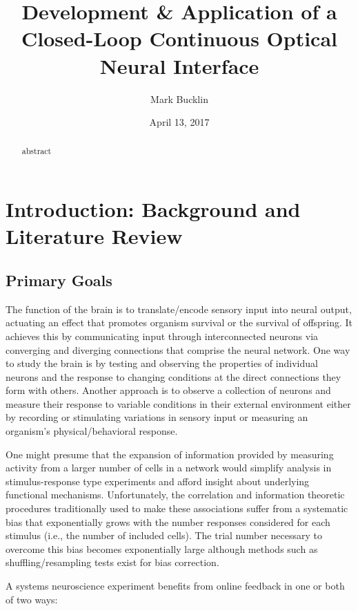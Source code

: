 \documentclass[
  12pt,
]{report}
\title{Development \& Application of a Closed-Loop Continuous Optical Neural
Interface}
\author{Mark Bucklin}
\date{April 13, 2017}
\numberwithin{figure}{section}
\numberwithin{table}{section}
\numberwithin{equations}{section}
\begin{document}
\maketitle
\begin{abstract}
abstract
\end{abstract}

{
\hypersetup{linkcolor=}
\setcounter{tocdepth}{2}
\tableofcontents
}
\listoftables
\listoffigures
\hypertarget{introduction-background-and-literature-review}{%
\chapter{Introduction: Background and Literature
Review}\label{introduction-background-and-literature-review}}

\hypertarget{primary-goals}{%
\section{Primary Goals}\label{primary-goals}}

The function of the brain is to translate/encode sensory input into
neural output, actuating an effect that promotes organism survival or
the survival of offspring. It achieves this by communicating input
through interconnected neurons via converging and diverging connections
that comprise the neural network. One way to study the brain is by
testing and observing the properties of individual neurons and the
response to changing conditions at the direct connections they form with
others. Another approach is to observe a collection of neurons and
measure their response to variable conditions in their external
environment either by recording or stimulating variations in sensory
input or measuring an organism's physical/behavioral response.

One might presume that the expansion of information provided by
measuring activity from a larger number of cells in a network would
simplify analysis in stimulus-response type experiments and afford
insight about underlying functional mechanisms. Unfortunately, the
correlation and information theoretic procedures traditionally used to
make these associations suffer from a systematic bias that exponentially
grows with the number responses considered for each stimulus (i.e., the
number of included cells). The trial number necessary to overcome this
bias becomes exponentially large although methods such as
shuffling/resampling tests exist for bias correction.

A systems neuroscience experiment benefits from online feedback in one
or both of two ways:
\end{document}
